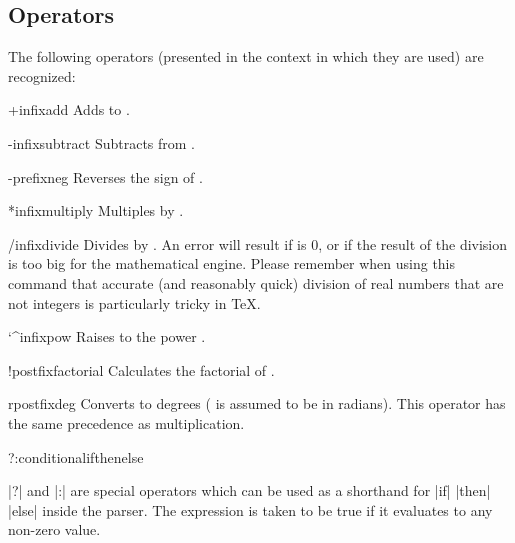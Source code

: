 \subsection{Operators}

\label{pgfmath-operators}

  The following operators (presented in the context in which they are used)
  are recognized:

\begin{math-operator}{+}{infix}{add}
 Adds  to .
\end{math-operator}

\begin{math-operator}{-}{infix}{subtract}
  Subtracts  from .
\end{math-operator}

\begin{math-operator}{-}{prefix}{neg}
  Reverses the sign of .
\end{math-operator}

\begin{math-operator}{*}{infix}{multiply}
  Multiples  by .
\end{math-operator}

\begin{math-operator}{/}{infix}{divide}
  Divides  by . An error will result if  is 0,
  or if the result of the division is too big for the mathematical
  engine. Please remember when using this command that accurate (and
  reasonably quick) division of real numbers that are not integers
  is particularly tricky in \TeX.
\end{math-operator}

\begin{math-operator}{\char`\^}{infix}{pow}
  Raises  to the power .
\end{math-operator}

\begin{math-operator}{!}{postfix}{factorial}
  Calculates the factorial of .
\end{math-operator}

\begin{math-operator}{r}{postfix}{deg}
  Converts  to degrees ( is assumed to be in radians).
  This operator has the same precedence as multiplication.
\end{math-operator}

\begin{math-operators}{?}{:}{conditional}{ifthenelse}

  |?| and |:| are special operators which can be used as a shorthand
  for |if|  |then|  |else|  inside the parser.
  The expression  is taken to be true if it evaluates to any
  non-zero value.

\end{math-operators}

